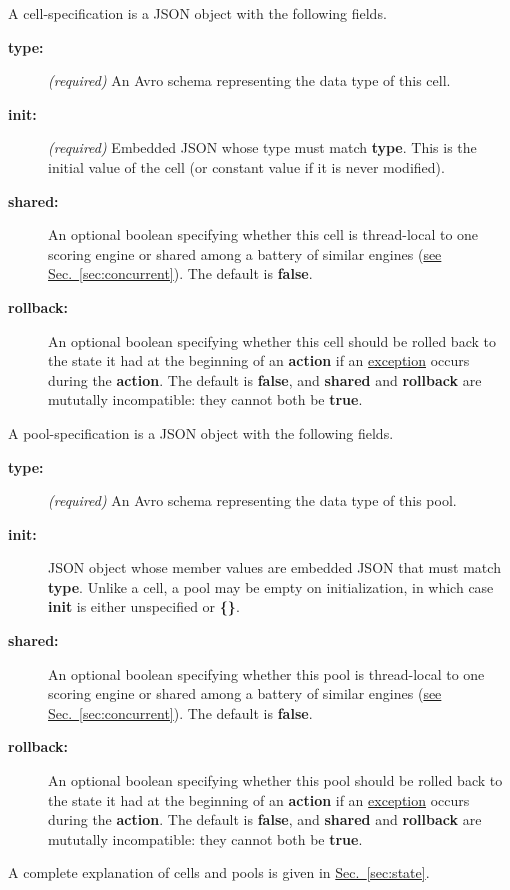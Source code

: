 \documentclass{article}
\newcommand{\PFAc}{\ttfamily\bfseries}
\newenvironment{allowedfields}%
  {\begin{center} \begin{minipage}{0.9\linewidth} \begin{description}}%
  {\end{description} \end{minipage} \end{center}}
\theoremstyle{definition}
\begin{document}
A cell-specification is a JSON object with the following fields.
\begin{allowedfields}
\item[\PFAc type:] {\it (required)} An Avro schema representing the data type of this cell.
\item[\PFAc init:] {\it (required)} Embedded JSON whose type must match {\PFAc type}.  This is the initial value of the cell (or constant value if it is never modified).
\item[\PFAc shared:] An optional boolean specifying whether this cell is thread-local to one scoring engine or shared among a battery of similar engines (\hyperlink{hsec:concurrent}{see Sec.~\ref{sec:concurrent}}).  The default is {\PFAc false}.
\item[\PFAc rollback:] An optional boolean specifying whether this cell should be rolled back to the state it had at the beginning of an {\PFAc action} if an \hyperlink{hsec:exceptions}{exception} occurs during the {\PFAc action}.  The default is {\PFAc false}, and {\PFAc shared} and {\PFAc rollback} are mututally incompatible: they cannot both be {\PFAc true}.
\end{allowedfields}

A pool-specification is a JSON object with the following fields.
\begin{allowedfields}
\item[\PFAc type:] {\it (required)} An Avro schema representing the data type of this pool.
\item[\PFAc init:] JSON object whose member values are embedded JSON that must match {\PFAc type}.  Unlike a cell, a pool may be empty on initialization, in which case {\PFAc init} is either unspecified or {\PFAc \{\}}.
\item[\PFAc shared:] An optional boolean specifying whether this pool is thread-local to one scoring engine or shared among a battery of similar engines (\hyperlink{hsec:concurrent}{see Sec.~\ref{sec:concurrent}}).  The default is {\PFAc false}.
\item[\PFAc rollback:] An optional boolean specifying whether this pool should be rolled back to the state it had at the beginning of an {\PFAc action} if an \hyperlink{hsec:exceptions}{exception} occurs during the {\PFAc action}.  The default is {\PFAc false}, and {\PFAc shared} and {\PFAc rollback} are mututally incompatible: they cannot both be {\PFAc true}.
\end{allowedfields}

A complete explanation of cells and pools is given in \hyperlink{hsec:state}{Sec.~\ref{sec:state}}.
\end{document}
